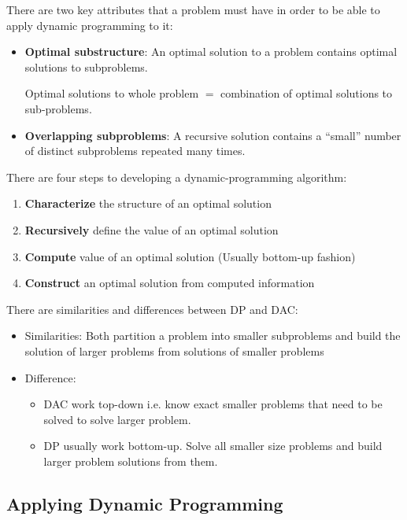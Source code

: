 \documentclass[10pt,a4paper]{article}
\begin{document}
There are two key attributes that a problem must have in order to be able to
apply dynamic programming to it:
\begin{itemize}
    \item \textbf{Optimal substructure}: An optimal solution to a problem contains optimal solutions to subproblems.
    
    Optimal solutions to whole problem $=$ combination of optimal solutions to sub-problems.
    \item \textbf{Overlapping subproblems}: A recursive solution contains a “small”
    number of distinct subproblems repeated many times.
\end{itemize}

There are four steps to developing a dynamic-programming algorithm:
\begin{enumerate}
    \item \textbf{Characterize} the structure of an optimal solution
    \item \textbf{Recursively} define the value of an optimal solution
    \item \textbf{Compute} value of an optimal solution (Usually bottom-up fashion)
    \item \textbf{Construct} an optimal solution from computed information
\end{enumerate}

There are similarities and differences between DP and DAC:
\begin{itemize}
    \item Similarities: Both partition a problem into smaller subproblems and build the solution of larger problems from solutions of smaller problems
    \item Difference:
    \begin{itemize}
        \item DAC work top-down i.e. know exact smaller problems that need to be solved to solve larger problem.
        \item DP usually work bottom-up. Solve all smaller size problems and build larger problem solutions from them.
    \end{itemize}
\end{itemize}

\pagebreak

\subsection{Applying Dynamic Programming}
\end{document}
